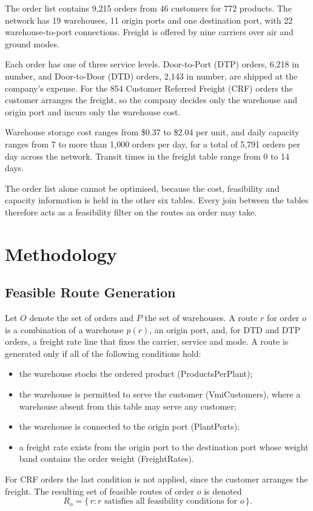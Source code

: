 \documentclass[conference]{IEEEtran}
\begin{document}
The order list contains 9,215 orders from 46 customers for 772 products. The network has 19 warehouses, 11 origin ports and one destination port, with 22 warehouse-to-port connections. Freight is offered by nine carriers over air and ground modes.

Each order has one of three service levels. Door-to-Port (DTP) orders, 6,218 in number, and Door-to-Door (DTD) orders, 2,143 in number, are shipped at the company's expense. For the 854 Customer Referred Freight (CRF) orders the customer arranges the freight, so the company decides only the warehouse and origin port and incurs only the warehouse cost.

Warehouse storage cost ranges from \$0.37 to \$2.04 per unit, and daily capacity ranges from 7 to more than 1,000 orders per day, for a total of 5,791 orders per day across the network. Transit times in the freight table range from 0 to 14 days.

The order list alone cannot be optimised, because the cost, feasibility and capacity information is held in the other six tables. Every join between the tables therefore acts as a feasibility filter on the routes an order may take.

\section{Methodology}

\subsection{Feasible Route Generation}
Let $O$ denote the set of orders and $P$ the set of warehouses. A route $r$ for order $o$ is a combination of a warehouse $p(r)$, an origin port, and, for DTD and DTP orders, a freight rate line that fixes the carrier, service and mode. A route is generated only if all of the following conditions hold:
\begin{itemize}
\item the warehouse stocks the ordered product (ProductsPerPlant);
\item the warehouse is permitted to serve the customer (VmiCustomers), where a warehouse absent from this table may serve any customer;
\item the warehouse is connected to the origin port (PlantPorts);
\item a freight rate exists from the origin port to the destination port whose weight band contains the order weight (FreightRates).
\end{itemize}
For CRF orders the last condition is not applied, since the customer arranges the freight. The resulting set of feasible routes of order $o$ is denoted
\begin{equation}
R_o = \{\, r : r \text{ satisfies all feasibility conditions for } o \,\}.
\end{equation}
\end{document}

